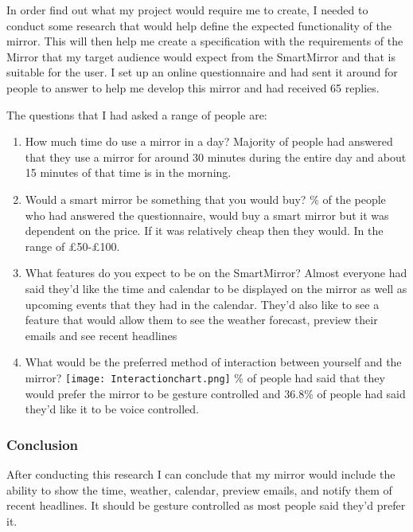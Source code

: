 \documentclass[12pt]{article}
\begin{document}
        In order find out what my project would require me to create, I needed to conduct some research that would help define the expected functionality of the mirror. This will then help me create a specification with the requirements of the Mirror that my target audience would expect from the SmartMirror and that is suitable for the user. I set up an online questionnaire and had sent it around for people to answer to help me develop this mirror and had received 65 replies.

        The questions that I had asked a range of people are:
        \begin{enumerate}
            \item How much time do use a mirror in a day?
                \subitem Majority of people had answered that they use a mirror for around 30 minutes during the entire day and about 15 minutes of that time is in the morning.
            \item Would a smart mirror be something that you would buy?
                \% of the people who had answered the questionnaire, would buy a smart mirror but it was dependent on the price. If it was relatively cheap then they would. In the range of £50-£100.
            \item What features do you expect to be on the SmartMirror?
                \subitem Almost everyone had said they'd like the time and calendar to be displayed on the mirror as well as upcoming events that they had in the calendar. They'd also like to see a feature that would allow them to see the weather forecast, preview their emails and see recent headlines
            \item What would be the preferred method of interaction between yourself and the mirror?
                \texttt{[image: Interactionchart.png]}
                \% of people had said that they would prefer the mirror to be gesture controlled and 36.8\% of people had said they'd like it to be voice controlled.
        \end{enumerate}

        \subsubsection{Conclusion}
            After conducting this research I can conclude that my mirror would include the ability to  show the time, weather, calendar, preview emails, and notify them of recent headlines. It should be gesture controlled as most people said they'd prefer it.
\end{document}
